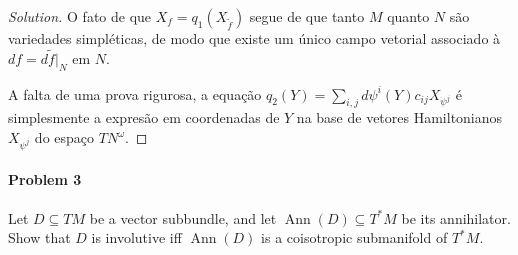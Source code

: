 \begin{proof}[Solution]
	O fato de que $X_f=q_1(X_{\tilde{f}})$ segue de que tanto $M$ quanto $N$ s\~ao variedades simpl\'eticas, de modo que existe um \'unico campo vetorial associado à  $df=d\tilde{f}|_{N}$ em $N$.

       A falta de uma prova rigurosa, a equa\c c\~ao $q_2(Y)=\sum_{i,j}d\psi^i(Y)c_{ij}X_{\psi^j}$ é simplesmente a expresão em coordenadas de $Y$ na base de vetores Hamiltonianos $X_{\psi^j}$ do espaço $T N^\omega$. 

\end{proof}

\paragraph{Problem 3} Let $D\subseteq TM$ be a vector subbundle, and let $\operatorname{Ann}(D) \subseteq T^*M$ be its annihilator. Show that $D$ is involutive iff $\operatorname{Ann}(D)$ is a coisotropic submanifold of $ T^*M$.

